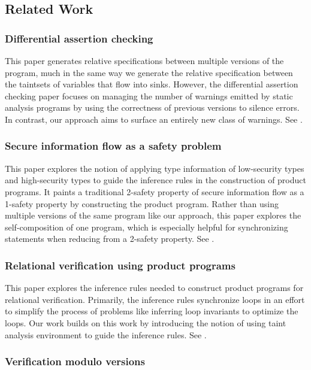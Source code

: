 \documentclass[letterpaper,twocolumn,10pt]{article}
\begin{document}
\subsection{Related Work}

\subsubsection{Differential assertion checking}

This paper generates relative specifications between multiple versions of the program, much in the same way we generate the relative specification between the taintsets of variables that flow into sinks. However, the differential assertion checking paper focuses on managing the number of warnings emitted by static analysis programs by using the correctness of previous versions to silence errors. In contrast, our approach aims to surface an entirely new class of warnings. See \cite{lahiri2013differential}.

\subsubsection{Secure information flow as a safety problem}
This paper explores the notion of applying type information of low-security types and high-security types to guide the inference rules in the construction of product programs. It paints a traditional 2-safety property of secure information flow as a 1-safety property by constructing the product program. Rather than using multiple versions of the same program like our approach, this paper explores the self-composition of one program, which is especially helpful for synchronizing statements when reducing from a 2-safety property. See  \cite{terauchi2005secure}.

\subsubsection{Relational verification using product programs}

This paper explores the inference rules needed to construct product programs for relational verification. Primarily, the inference rules synchronize loops in an effort to simplify the process of problems like inferring loop invariants to optimize the loops. Our work builds on this work by introducing the notion of using taint analysis environment to guide the inference rules. See \cite{barthe2011relational}.

\subsubsection{Verification modulo versions}
\end{document}
